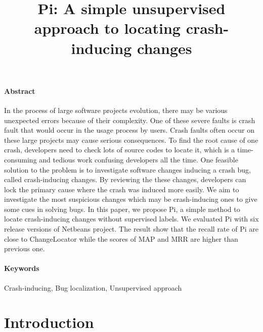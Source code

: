 \documentclass[a4paper]{article}
\title{Pi: A simple unsupervised approach to locating crash-inducing changes}
\author{}
\date{}
\begin{document}
\maketitle

\paragraph{Abstract}
In the process of large software projects evolution, there may be various unexpected errors because of their complexity. One of these severe faults is crash fault that would occur in the usage process by users. Crash faults often occur on these large projects may cause serious consequences. To find the root cause of one crash, developers need to check lots of source codes to locate it, which is a time-consuming and tedious work confusing developers all the time. One feasible solution to the problem is to investigate software changes inducing a crash bug, called crash-inducing changes\cite{ChangeLocator}. By reviewing the these changes, developers can lock the primary cause where the crash was induced more easily. We aim to investigate the most suspicious changes which may be crash-inducing ones to give some cues in solving bugs. In this paper, we propose Pi, a simple method to locate crash-inducing changes without supervised labels. We evaluated Pi with six release versions of Netbeans project. The result show that the recall rate of Pi are close to ChangeLocator while the scores of MAP and MRR are higher than previous one.
\vspace{-1em}

\paragraph{Keywords}
Crash-inducing, Bug localization, Unsupervised approach
\vspace{-1em}


\section{Introduction}
\end{document}

